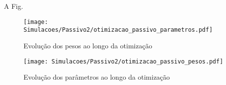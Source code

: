 A Fig.

\begin{figure}[th!]
	\centering
	\texttt{[image: Simulacoes/Passivo2/otimizacao\_passivo\_parametros.pdf]}
	\caption{Evolução dos pesos ao longo da otimização}
	\label{fig:otimizacao_passivo_parametros}
\end{figure} 

\begin{figure}[th!]
	\centering
	\texttt{[image: Simulacoes/Passivo2/otimizacao\_passivo\_pesos.pdf]}
	\caption{Evolução dos parâmetros ao longo da otimização}
	\label{fig:otimizacao_passivo_pesos}
\end{figure} 


%
%
%
%
%
%
% 
